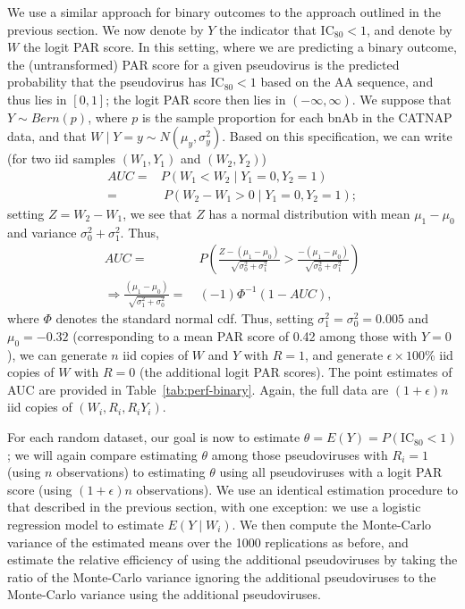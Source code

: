 \documentclass[10pt]{article}
\begin{document}
We use a similar approach for binary outcomes to the approach outlined in the previous section. We now denote by $Y$ the indicator that IC$_{80} < 1$, and denote by $W$ the logit PAR score. In this setting, where we are predicting a binary outcome, the (untransformed) PAR score for a given pseudovirus is the predicted probability that the pseudovirus has IC$_{80} < 1$ based on the AA sequence, and thus lies in $[0,1]$; the logit PAR score then lies in $(-\infty, \infty)$. We suppose that $Y \sim Bern(p)$, where $p$ is the sample proportion for each bnAb in the CATNAP data, and that $W \mid Y = y \sim N(\mu_y, \sigma^2_y)$. Based on this specification, we can write (for two iid samples $(W_1, Y_1)$ and $(W_2, Y_2)$)
\begin{align*}
    AUC =& P(W_1 < W_2 \mid Y_1 = 0, Y_2 = 1) \\
    =& \ P(W_2 - W_1 > 0 \mid Y_1 = 0, Y_2 = 1);
\end{align*}
setting $Z = W_2 - W_1$, we see that $Z$ has a normal distribution with mean $\mu_1 - \mu_0$ and variance $\sigma^2_0 + \sigma^2_1$. Thus,
\begin{align*}
    AUC =& \ P\left(\frac{Z - (\mu_1 - \mu_0)}{\sqrt{\sigma^2_0 + \sigma^2_1}} > \frac{- (\mu_1 - \mu_0)}{\sqrt{\sigma^2_0 + \sigma^2_1}}\right) \\
    \Rightarrow \frac{(\mu_1 - \mu_0)}{\sqrt{\sigma^2_1 + \sigma^2_0}} =& \ (-1)\Phi^{-1}(1 - AUC),
\end{align*}
where $\Phi$ denotes the standard normal cdf. Thus, setting $\sigma^2_1 = \sigma^2_0 = 0.005$ and $\mu_0 = -0.32$ (corresponding to a mean PAR score of 0.42 among those with $Y = 0$), we can generate $n$ iid copies of $W$ and $Y$ with $R = 1$, and generate $\epsilon \times 100$\% iid copies of $W$ with $R = 0$ (the additional logit PAR scores). The point estimates of AUC are provided in Table~\ref{tab:perf-binary}. Again, the full data are $(1 + \epsilon)n$ iid copies of $(W_i, R_i, R_iY_i)$.

For each random dataset, our goal is now to estimate $\theta = E(Y) = P(\text{IC}_{80} < 1)$; we will again compare estimating $\theta$ among those pseudoviruses with $R_i = 1$ (using $n$ observations) to estimating $\theta$ using all pseudoviruses with a logit PAR score (using $(1+\epsilon)n$ observations). We use an identical estimation procedure to that described in the previous section, with one exception: we use a logistic regression model to estimate $E(Y \mid W_i)$. We then compute the Monte-Carlo variance of the estimated means over the 1000 replications as before, and estimate the relative efficiency of using the additional pseudoviruses by taking the ratio of the Monte-Carlo variance ignoring the additional pseudoviruses to the Monte-Carlo variance using the additional pseudoviruses.
\end{document}
